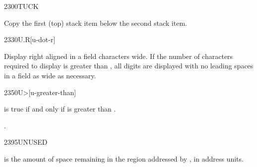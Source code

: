 \begin{worddef}{2300}{TUCK}
\item {}

	Copy the first (top) stack item below the second stack item.
\end{worddef}


\begin{worddef}{2330}{U.R}[u-dot-r]
\item {}

	Display  right aligned in a field  characters
	wide. If the number of characters required to display 
	is greater than , all digits are displayed with no leading
	spaces in a field as wide as necessary.
\end{worddef}


\begin{worddef}[Umore]{2350}{U>}[u-greater-than]
\item {}

	 is true if and only if  is greater than
	.

\see {}.
\end{worddef}


\begin{worddef}{2395}{UNUSED}
\item {}

	 is the amount of space remaining in the region addressed
	by , in address units.
\end{worddef}


